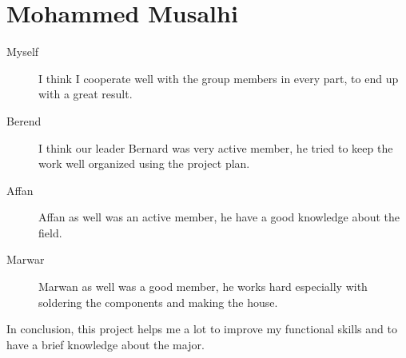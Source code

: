 \section{Mohammed Musalhi}

\begin{description}
\item[Myself]
I think I cooperate well with the group members in every part,  to end up with a great result.
\item[Berend]
I think our leader Bernard was very active member, he tried to keep the work well organized using the project plan.
\item[Affan]
Affan as well was an active member, he have a good knowledge about the field.
\item[Marwar]
Marwan as well was a good member, he works hard especially with soldering the components and making the house.
\end{description}

In conclusion, this project helps me a lot to improve my functional skills and to have a brief knowledge about the major.

